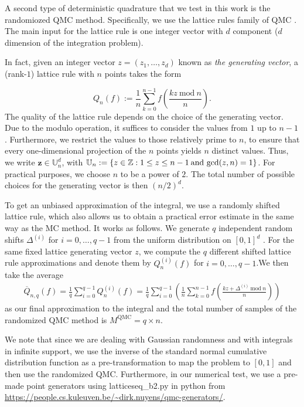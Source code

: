 A second type of deterministic quadrature that we test in this work is the randomiozed QMC method. Specifically, we use the lattice rules family of QMC \cite{sloan1985lattice,cools2008belgian,nuyens2014construction}.  The main input for the lattice rule is one integer vector with $d$ component ($d$ dimension of the integration problem).

In fact, given an integer vector $z = (z_1,\dots, z_d)$ known as \textit{the generating vector}, a (rank-$1$) lattice rule with $n$ points takes the form

\begin{equation}
Q_n(f):=\frac{1}{n}\sum_{k=0}^{n-1} f \left( \frac{kz \: \text{mod}\: n}{n}\right).
\end{equation}
The quality of the lattice rule depends on the choice of the generating vector. Due to the modulo operation, it suffices to consider the values from $1$ up to $n-1$. Furthermore, we restrict the values to those relatively prime to $n$, to ensure that every one-dimensional projection of the $n$ points yields $n$ distinct values. Thus, we write $\mathbf{z} \in \mathbb{U}_n^d$, with $\mathbb{U}_n:=\{z \in \mathbb{Z}: 1 \le z \le n-1\: \text{and gcd}(z,n)=1\}$. For practical purposes,  we choose $n$  to be a power of $2$. The total number of possible choices for the generating vector is then  $(n/2)^d$. 

To get an unbiased approximation of the integral, we use  a randomly shifted lattice rule, which also allows us to obtain a practical error estimate in the same way as the MC method. It works as follows. We generate $q$ independent random shifts $\Delta^{(i)}$ for $i=0,\dots,q-1$ from the uniform distribution on $[0,1]^d$ . For the same fixed lattice generating vector $z$, we compute the $q$ different shifted lattice rule approximations and denote
them by $Q^{(i )}_n(f)$ for $i=0,\dots,q-1$.We then take the average
\begin{align}
\overline{Q}_{n,q}(f)=\frac{1}{q} \sum_{i=0}^{q-1}Q^{(i )}_n(f)=\frac{1}{q}\sum_{i=0}^{q-1}\left(\frac{1}{n}\sum_{k=0}^{n-1} f \left( \frac{kz+\Delta^{(i)}  \: \text{mod}\: n}{n}\right)  \right)
\end{align}
as our final approximation to the integral and the total number of samples of the randomized QMC method is $M^{\text{QMC}}=q \times n$.

We note that since we are dealing with Gaussian randomness and with integrals in infinite support, we use the inverse of the standard normal cumulative distribution function as a pre-transformation to map the problem to $[0,1]$ and then use the randomized QMC. Furthermore, in our numerical test, we use a pre-made point generators using latticeseq\_b2.py in python from   \url{https://people.cs.kuleuven.be/~dirk.nuyens/qmc-generators/}.
